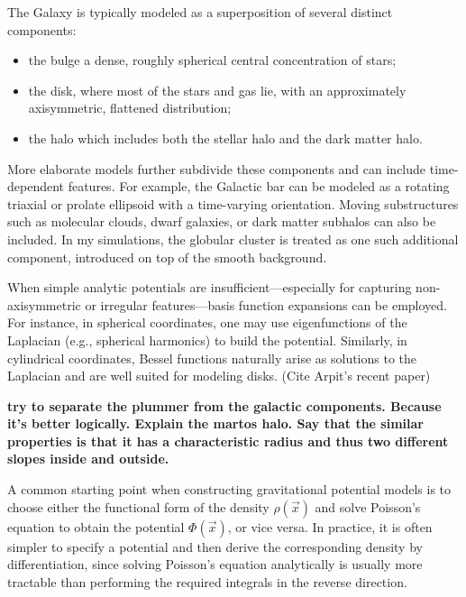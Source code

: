         The Galaxy is typically modeled as a superposition of several distinct components:

        \begin{itemize}
            \item the bulge a dense, roughly spherical central concentration of stars;
            \item the disk, where most of the stars and gas lie, with an approximately axisymmetric, flattened distribution;
            \item the halo which includes both the stellar halo and the dark matter halo.
        \end{itemize}

        More elaborate models further subdivide these components and can include time-dependent features. For example, the Galactic bar can be modeled as a rotating triaxial or prolate ellipsoid with a time-varying orientation. Moving substructures such as molecular clouds, dwarf galaxies, or dark matter subhalos can also be included. In my simulations, the globular cluster is treated as one such additional component, introduced on top of the smooth background.

        When simple analytic potentials are insufficient—especially for capturing non-axisymmetric or irregular features—basis function expansions can be employed. For instance, in spherical coordinates, one may use eigenfunctions of the Laplacian (e.g., spherical harmonics) to build the potential. Similarly, in cylindrical coordinates, Bessel functions naturally arise as solutions to the Laplacian and are well suited for modeling disks. (Cite Arpit's recent paper)


        \textbf{try to separate the plummer from the galactic components. Because it's better logically. Explain the martos halo. Say that the similar properties is that it has a characteristic radius and thus two different slopes inside and outside. }

        A common starting point when constructing gravitational potential models is to choose either the functional form of the density $\rho(\vec{x})$ and solve Poisson's equation to obtain the potential $\Phi(\vec{x})$, or vice versa. In practice, it is often simpler to specify a potential and then derive the corresponding density by differentiation, since solving Poisson's equation analytically is usually more tractable than performing the required integrals in the reverse direction.

